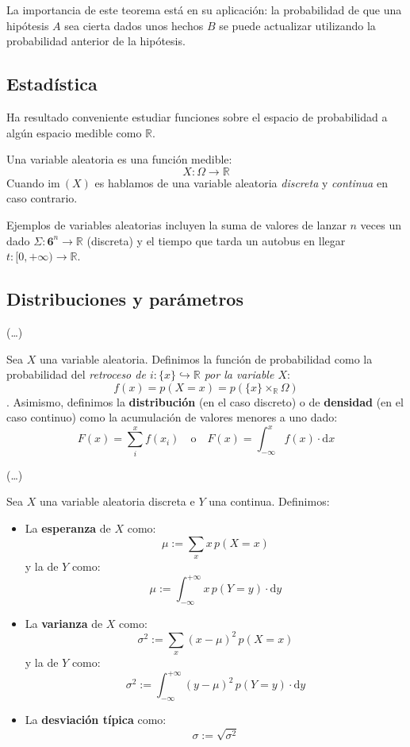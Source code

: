 \documentclass[10pt]{article}
\newcommand{\diff}{\mathrm{d}}
\newcommand{\im}{\mathrm{im}\:}
\newcommand{\R}{\mathbb{R}}
\begin{document}
La importancia de este teorema está en su aplicación: la probabilidad de que una hipótesis $ A $ sea cierta dados unos hechos $ B $ se puede actualizar utilizando la probabilidad
anterior de la hipótesis.

\subsection{Estadística}

Ha resultado conveniente estudiar funciones sobre el espacio de probabilidad a algún espacio medible como $ \R $.

\begin{definition}
  Una variable aleatoria es una función medible:
  \[ X : \Omega \to \R \]
  Cuando $ \im(X) $ es hablamos de una variable aleatoria \textit{discreta} y \textit{continua} en caso contrario.
\end{definition}

\begin{example}
  Ejemplos de variables aleatorias incluyen la suma de valores de lanzar $ n $ veces un dado $ \Sigma : \mathbf{6}^n \to \mathbb{R} $ (discreta) y el tiempo que tarda un
  autobus en llegar $ t : [0, +\infty) \to \mathbb{R} $.
\end{example}

\subsection{Distribuciones y parámetros}

(\dots)

\begin{definition}[Distribuciones]
  Sea $ X $ una variable aleatoria. Definimos la función de probabilidad como la probabilidad del \textit{retroceso de $ i : \{x\} \hookrightarrow \mathbb{R} $ por la variable $ X $}:
  \[ f(x) = p(X = x) = p(\{x\}\times_\mathbb{R}\Omega) \].
  Asimismo, definimos la \textbf{distribución} (en el caso discreto) o de \textbf{densidad} (en el caso continuo) como la acumulación de valores menores a uno dado:
  \[ F(x) = \sum_i^x f(x_i) \quad \text{o} \quad F(x) = \int_{-\infty}^x f(x) \cdot \diff x \]
\end{definition}

(\dots)

\begin{definition}[Parámetros]
  Sea $X$ una variable aleatoria discreta e $Y$ una continua. Definimos:

  \begin{itemize}
    \item La \textbf{esperanza} de $ X $ como: 
      \[ \mu := \sum_x x \, p(X = x) \]
      y la de $ Y $ como:
      \[ \mu := \int_{-\infty}^{+\infty} x \, p(Y = y) \cdot \diff y \]
    \item La \textbf{varianza} de $ X $ como:
      \[ \sigma^2 := \sum_x (x - \mu)^2\, p(X = x) \]
      y la de $ Y $ como:
      \[ \sigma^2 := \int_{-\infty}^{+\infty} (y - \mu)^2\, p(Y = y) \cdot \diff y \]
    \item La \textbf{desviación típica} como:
      \[ \sigma := \sqrt{\sigma^2} \]
  \end{itemize}
\end{definition}
\end{document}
